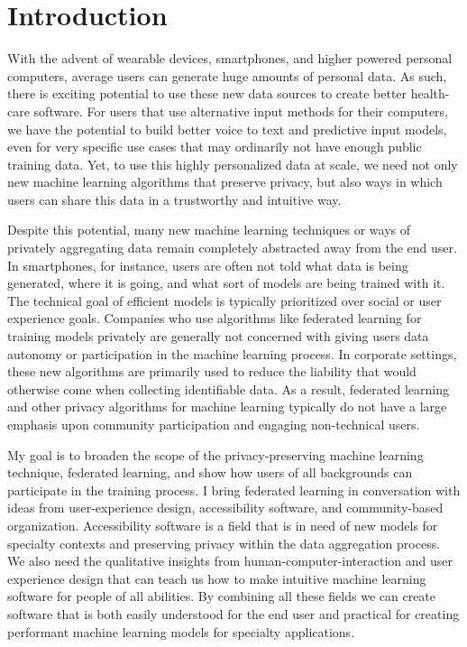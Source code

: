 \documentclass[manuscript,screen,review]{acmart}
\begin{document}
\section{Introduction}
With the advent of wearable devices, smartphones, and higher powered personal computers, average users can generate huge amounts of personal data.  As such, there is exciting potential to use these new data sources to create better health-care software.  For users that use alternative input methods for their computers,  we have the potential to build better voice to text and predictive input models, even for very specific use cases that may ordinarily not have enough public training data. Yet, to use this highly personalized data at scale, we need not only new machine learning algorithms that preserve privacy, but also ways in which users can share this data in a trustworthy and intuitive way.

Despite this potential, many new machine learning techniques or ways of privately aggregating data remain completely abstracted away from the end user. In smartphones, for instance, users are often not told what data is being generated, where it is going, and what sort of models are being trained with it. The technical goal of efficient models is typically prioritized over social or user experience goals. Companies who use algorithms like federated learning for training models privately are generally not concerned with giving users data autonomy or participation in the machine learning process. In corporate settings, these new algorithms are primarily used to reduce the liability that would otherwise come when collecting identifiable data. As a result, federated learning and other privacy algorithms for machine learning typically do not have a large emphasis upon community participation and engaging non-technical users.

My goal is to broaden the scope of the privacy-preserving machine learning technique, federated learning, and show how users of all backgrounds can participate in the training process.  I bring federated learning in conversation with ideas from user-experience design, accessibility software, and community-based organization. Accessibility software is a field that is in need of new models for specialty contexts and preserving privacy within the data aggregation process. We also need the qualitative insights from human-computer-interaction and user experience design that can teach us how to make intuitive machine learning software for people of all abilities. By combining all these fields we can create software that is both easily understood for the end user and practical for creating performant machine learning models for specialty applications.
\end{document}

